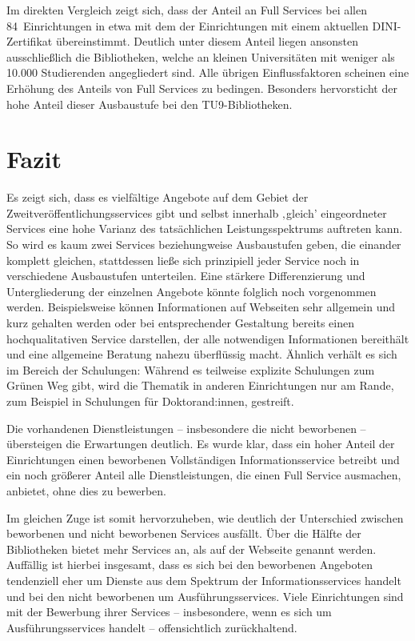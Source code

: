 \documentclass[a4paper,
fontsize=11pt,
oneside,
numbers=noperiodatend,
parskip=half-,
bibliography=totoc,
final
]{scrartcl}
\begin{document}
Im direkten Vergleich zeigt sich, dass der Anteil an Full Services bei
allen 84~Einrichtungen in etwa mit dem der Einrichtungen mit einem
aktuellen DINI-Zertifikat übereinstimmt. Deutlich unter diesem Anteil
liegen ansonsten ausschließlich die Bibliotheken, welche an kleinen
Universitäten mit weniger als 10.000 Studierenden angegliedert sind.
Alle übrigen Einflussfaktoren scheinen eine Erhöhung des Anteils von
Full Services zu bedingen. Besonders hervorsticht der hohe Anteil dieser
Ausbaustufe bei den TU9-Bibliotheken.

\pagebreak 

\hypertarget{fazit}{%
\section{Fazit}\label{fazit}}

Es zeigt sich, dass es vielfältige Angebote auf dem Gebiet der
Zweitveröffentlichungsservices gibt und selbst innerhalb ‚gleich'
eingeordneter Services eine hohe Varianz des tatsächlichen
Leistungsspektrums auftreten kann. So wird es kaum zwei Services
beziehungweise Ausbaustufen geben, die einander komplett gleichen,
stattdessen ließe sich prinzipiell jeder Service noch in verschiedene
Ausbaustufen unterteilen. Eine stärkere Differenzierung und
Untergliederung der einzelnen Angebote könnte folglich noch vorgenommen
werden. Beispielsweise können Informationen auf Webseiten sehr allgemein
und kurz gehalten werden oder bei entsprechender Gestaltung bereits
einen hochqualitativen Service darstellen, der alle notwendigen
Informationen bereithält und eine allgemeine Beratung nahezu überflüssig
macht. Ähnlich verhält es sich im Bereich der Schulungen: Während es
teilweise explizite Schulungen zum Grünen Weg gibt, wird die Thematik in
anderen Einrichtungen nur am Rande, zum Beispiel in Schulungen für
Doktorand:innen, gestreift.

Die vorhandenen Dienstleistungen -- insbesondere die nicht beworbenen --
übersteigen die Erwartungen deutlich. Es wurde klar, dass ein hoher
Anteil der Einrichtungen einen beworbenen Vollständigen
Informationsservice betreibt und ein noch größerer Anteil alle
Dienstleistungen, die einen Full Service ausmachen, anbietet, ohne dies
zu bewerben.

Im gleichen Zuge ist somit hervorzuheben, wie deutlich der Unterschied
zwischen beworbenen und nicht beworbenen Services ausfällt. Über die
Hälfte der Bibliotheken bietet mehr Services an, als auf der Webseite
genannt werden. Auffällig ist hierbei insgesamt, dass es sich bei den
beworbenen Angeboten tendenziell eher um Dienste aus dem Spektrum der
Informationsservices handelt und bei den nicht beworbenen um
Ausführungsservices. Viele Einrichtungen sind mit der Bewerbung ihrer
Services -- insbesondere, wenn es sich um Ausführungsservices handelt --
offensichtlich zurückhaltend.
\end{document}
